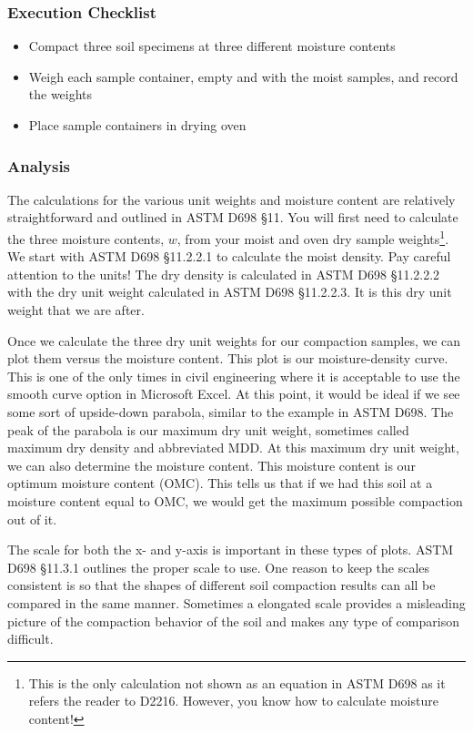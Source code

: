 \documentclass[12pt]{article}
\begin{document}
\subsubsection*{Execution Checklist}
\begin{itemize}
    \item Compact three soil specimens at three different moisture contents
    \item Weigh each sample container, empty and with the moist samples, and record the weights
    \item Place sample containers in drying oven
\end{itemize}

\subsubsection{Analysis}
The calculations for the various unit weights and moisture content are relatively straightforward and outlined in ASTM D698 \S11. You will first need to calculate the three moisture contents, $w$, from your moist and oven dry sample weights\footnote{This is the only calculation not shown as an equation in ASTM D698 as it refers the reader to D2216. However, you know how to calculate moisture content!}. We start with ASTM D698 \S11.2.2.1 to calculate the moist density. Pay careful attention to the units! The dry density is calculated in ASTM D698 \S11.2.2.2 with the dry unit weight calculated in ASTM D698 \S11.2.2.3. It is this dry unit weight that we are after.

Once we calculate the three dry unit weights for our compaction samples, we can plot them versus the moisture content. This plot is our moisture-density curve. This is one of the only times in civil engineering where it is acceptable to use the smooth curve option in Microsoft Excel\textregistered{}. At this point, it would be ideal if we see some sort of upside-down parabola, similar to the example in ASTM D698. The peak of the parabola is our maximum dry unit weight, sometimes called maximum dry density and abbreviated MDD. At this maximum dry unit weight, we can also determine the moisture content. This moisture content is our optimum moisture content (OMC). This tells us that if we had this soil at a moisture content equal to OMC, we would get the maximum possible compaction out of it.

The scale for both the x- and y-axis is important in these types of plots. ASTM D698 \S11.3.1 outlines the proper scale to use. One reason to keep the scales consistent is so that the shapes of different soil compaction results can all be compared in the same manner. Sometimes a elongated scale provides a misleading picture of the compaction behavior of the soil and makes any type of comparison difficult.
\end{document}
